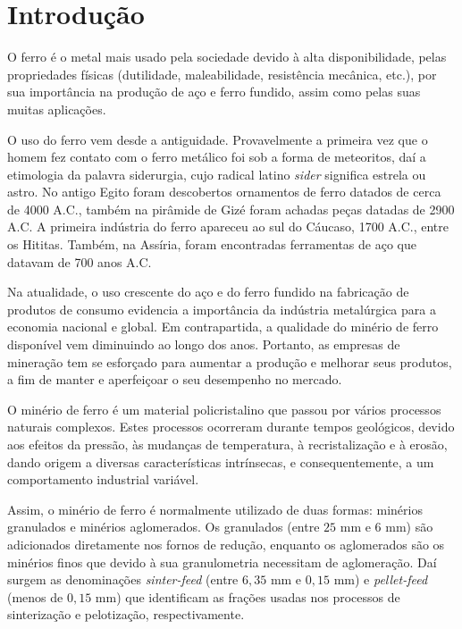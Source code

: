 
\chapter{Introdução}

O ferro é o metal mais usado pela sociedade devido à alta
disponibilidade, pelas propriedades físicas (dutilidade,
maleabilidade, resistência mecânica, etc.), por sua importância na
produção de aço e ferro fundido, assim como pelas suas muitas
aplicações.

O uso do ferro vem desde a antiguidade. Provavelmente a primeira vez
que o homem fez contato com o ferro metálico foi sob a forma de
meteoritos, daí a etimologia da palavra siderurgia, cujo radical
latino \textit{sider} significa estrela ou astro. No antigo Egito
foram descobertos ornamentos de ferro datados de cerca de 4000 A.C.,
também na pirâmide de Gizé foram achadas peças datadas de 2900 A.C. A
primeira indústria do ferro apareceu ao sul do Cáucaso, 1700 A.C.,
entre os Hititas. Também, na Assíria, foram encontradas ferramentas de
aço que datavam de 700 anos A.C. \cite{1}

Na atualidade, o uso crescente do aço e do ferro fundido na fabricação
de produtos de consumo evidencia a importância da indústria
metalúrgica para a economia nacional e global. Em contrapartida, a
qualidade do minério de ferro disponível vem diminuindo ao longo dos
anos. Portanto, as empresas de mineração tem se esforçado para
aumentar a produção e melhorar seus produtos, a fim de manter e
aperfeiçoar o seu desempenho no mercado.

O minério de ferro é um material policristalino que passou por vários
processos naturais complexos. Estes processos ocorreram durante tempos
geológicos, devido aos efeitos da pressão, às mudanças de temperatura,
à recristalização e à erosão, dando origem a diversas características
intrínsecas, e consequentemente, a um comportamento industrial
variável.\cite{2}

Assim, o minério de ferro é normalmente utilizado de duas formas:
minérios granulados e minérios aglomerados. Os granulados (entre $25$
mm e $6$ mm) são adicionados diretamente nos fornos de redução,
enquanto os aglomerados são os minérios finos que devido à sua
granulometria necessitam de aglomeração. Daí surgem as denominações
\textit{sinter-feed} (entre $6,35$ mm e $0,15$ mm) e
\textit{pellet-feed} (menos de $0,15$ mm) que identificam as frações
usadas nos processos de sinterização e pelotização,
respectivamente.\cite{3}

